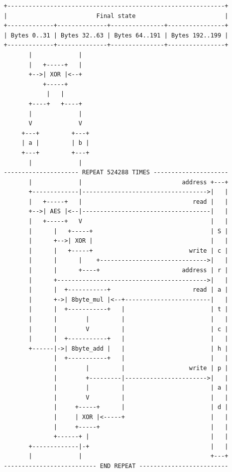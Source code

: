 \begin{verbatim}
   +-------------------------------------------------------------+
   |                         Final state                         |
   +-------------+--------------+---------------+----------------+
   | Bytes 0..31 | Bytes 32..63 | Bytes 64..191 | Bytes 192..199 |
   +-------------+--------------+---------------+----------------+
          |             |
          |   +-----+   |
          +-->| XOR |<--+
              +-----+
               |   |
          +----+   +----+
          |             |
          V             V
        +---+         +---+
        | a |         | b |
        +---+         +---+
          |             |
   --------------------- REPEAT 524288 TIMES ---------------------
          |             |                            address +---+
          +-------------|----------------------------------->|   |
          |   +-----+   |                               read |   |
          +-->| AES |<--|------------------------------------|   |
          |   +-----+   V                                    |   |
          |      |   +-----+                                 | S |
          |      +-->| XOR |                                 |   |
          |      |   +-----+                           write | c |
          |      |      |    +------------------------------>|   |
          |      |      +----+                       address | r |
          |      +------------------------------------------>|   |
          |      |  +-----------+                       read | a |
          |      +->| 8byte_mul |<--+------------------------|   |
          |      |  +-----------+   |                        | t |
          |      |        |         |                        |   |
          |      |        V         |                        | c |
          |      |  +-----------+   |                        |   |
          +------|->| 8byte_add |   |                        | h |
                 |  +-----------+   |                        |   |
                 |        |         |                  write | p |
                 |        +---------|----------------------->|   |
                 |        |         |                        | a |
                 |        V         |                        |   |
                 |     +-----+      |                        | d |
                 |     | XOR |<-----+                        |   |
                 |     +-----+                               |   |
                 +------+ |                                  |   |
          +-------------|-+                                  |   |
          |             |                                    +---+
   -------------------------- END REPEAT -------------------------
\end{verbatim}

